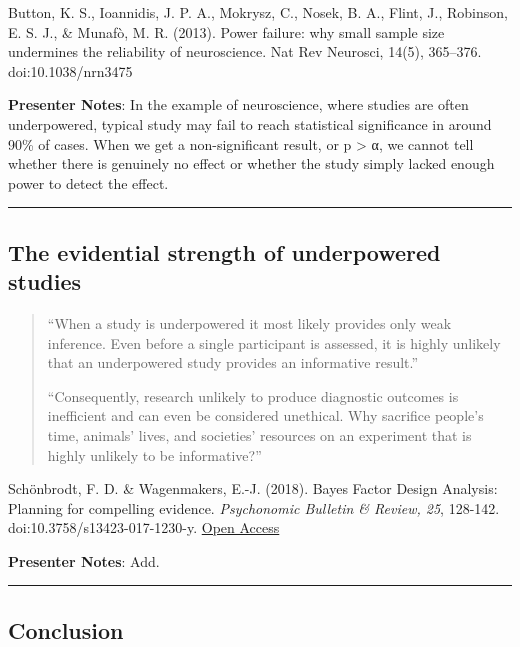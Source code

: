 \documentclass[
  english,
  letterpaper,
  DIV=11,
  numbers=noendperiod]{scrartcl}
\begin{document}
Button, K. S., Ioannidis, J. P. A., Mokrysz, C., Nosek, B. A., Flint,
J., Robinson, E. S. J., \& Munafò, M. R. (2013). Power failure: why
small sample size undermines the reliability of neuroscience. Nat Rev
Neurosci, 14(5), 365--376. doi:10.1038/nrn3475

\textbf{Presenter Notes}: In the example of neuroscience, where studies
are often underpowered, typical study may fail to reach statistical
significance in around 90\% of cases. When we get a non-significant
result, or p \textgreater{} α, we cannot tell whether there is genuinely
no effect or whether the study simply lacked enough power to detect the
effect.

\begin{center}\rule{0.5\linewidth}{0.5pt}\end{center}

\subsection{The evidential strength of underpowered
studies}\label{the-evidential-strength-of-underpowered-studies}

\begin{quote}
``When a study is underpowered it most likely provides only weak
inference. Even before a single participant is assessed, it is highly
unlikely that an underpowered study provides an informative result.''

``Consequently, research unlikely to produce diagnostic outcomes is
inefficient and can even be considered unethical. Why sacrifice people's
time, animals' lives, and societies' resources on an experiment that is
highly unlikely to be informative?''
\end{quote}

Schönbrodt, F. D. \& Wagenmakers, E.-J. (2018). Bayes Factor Design
Analysis: Planning for compelling evidence. \emph{Psychonomic Bulletin
\& Review, 25}, 128-142. doi:10.3758/s13423-017-1230-y.
\href{https://osf.io/d4dcu/}{Open Access}

\textbf{Presenter Notes}: Add.

\begin{center}\rule{0.5\linewidth}{0.5pt}\end{center}

\subsection{Conclusion}\label{conclusion}
\end{document}
